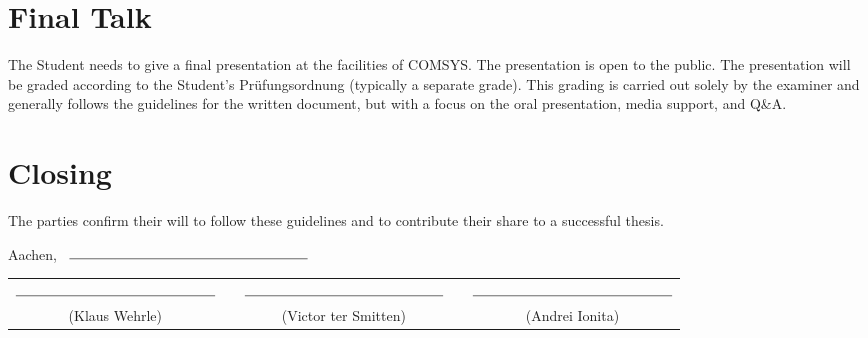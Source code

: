 \documentclass[noaccount,foldmarks,list,nomfg,english,nodate]{style/comsys-letter}
\def\companySignee{Victor ter Smitten}
\def\student{Andrei Ionita}
\begin{document}
\section{Final Talk}

The Student needs to give a final presentation at the facilities of COMSYS.
The presentation is open to the public.
The presentation will be graded according to the Student's Prüfungsordnung (typically a separate grade).
This grading is carried out solely by the examiner and generally follows the guidelines for the written document, but with a focus on the oral presentation, media support, and Q\&A.

\section{Closing}

The parties confirm their will to follow these guidelines and to contribute their share to a successful thesis.

\vskip 1cm

Aachen,  ~$\rule{6cm}{0.15mm}$

\vskip 2cm

\begin{tabular}{ccccc }
	$\rule{5cm}{0.15mm}$ & \phantom{A}& $\rule{5cm}{0.15mm}$ & \phantom{A}& $\rule{5cm}{0.15mm}$ \\
	\footnotesize (Klaus Wehrle) & & \footnotesize (\companySignee{}) & & \footnotesize (\student{})
\end{tabular}
\end{document}
